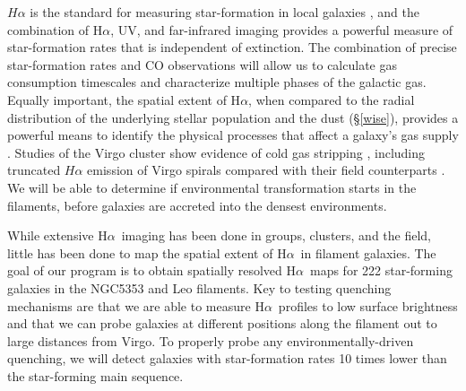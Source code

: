 \documentclass[11pt, preprint]{aastex}
\newcommand{\ha}{H$\alpha$}
\begin{document}
$H\alpha$ is the standard for measuring star-formation in local galaxies
\citep[e.g.][]{kennicutt98}, and the combination of \ha, UV, 
and far-infrared imaging provides a powerful measure of star-formation
rates that is independent of extinction.  The
combination of precise star-formation rates and CO observations will allow us to calculate
gas consumption timescales and characterize multiple phases of the
galactic gas. 
Equally important, the spatial extent of \ha, when compared to the
radial distribution of the underlying stellar population and the dust (\S\ref{wise}), provides a powerful
means to identify the physical processes that affect a galaxy's gas
supply \citep[e.g.][]{hodge83, dale01, gavazzi12,boselli15}.
Studies of the Virgo cluster show evidence of cold gas stripping
\citep[e.g.][]{crowl05, chung07, corbelli12, gavazzi12, boselli15}, including truncated $H\alpha$ emission of Virgo spirals
compared with their field counterparts \citep{koopmann04}.
We will be able to determine if environmental transformation starts in
the filaments, before galaxies are accreted into the densest environments.

While extensive \ha \ imaging has been done in groups, clusters, and the field,
little has been done to map the spatial extent of \ha \ in filament
galaxies.  
The goal of our program is to obtain spatially resolved \ha \ maps for 222 star-forming galaxies in
the NGC5353 and Leo filaments. Key to testing quenching mechanisms are that we are able to measure \ha \ profiles to low surface brightness and that we can
probe galaxies at different positions along the filament out to large
distances from Virgo.
To properly probe any environmentally-driven quenching, we will detect galaxies
with star-formation rates 10 times lower than the star-forming main sequence. 
\end{document}
